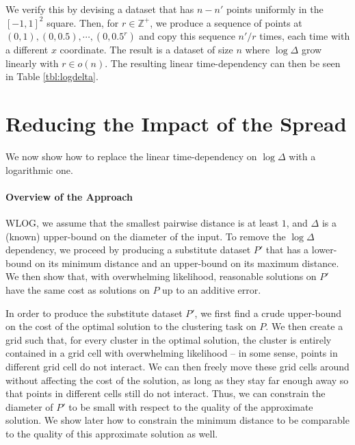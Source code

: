 We verify this by devising a dataset that has $n - n'$ points uniformly in the $[-1, 1]^2$ square. Then, for $r \in \mathbb{Z}^+$, we produce a sequence of
points at $(0, 1), (0, 0.5), \cdots, (0, 0.5^r)$ and copy this sequence $n' / r$ times, each time with a different $x$ coordinate. The result is a dataset of
size $n$ where $\log \Delta$ grow linearly with $r \in o(n)$. The resulting linear time-dependency can then be seen in Table \ref{tbl:logdelta}.



\section{Reducing the Impact of the Spread}
\label{sec:theory} %
\newcommand{\boxsize}{\textsc{MaxDist}}
We now show how to replace the linear time-dependency on $\log \Delta$ with a logarithmic one.

\paragraph*{Overview of the Approach}

WLOG, we assume that the smallest pairwise distance is at least $1$, and $\Delta$ is a (known) upper-bound on the diameter of the input. To remove
the $\log\Delta$ dependency, we proceed by producing a substitute dataset $P'$ that has a lower-bound on its minimum distance and an upper-bound on its maximum
distance. We then show that, with overwhelming likelihood, reasonable solutions on $P'$ have the same cost as solutions on $P$ up to an additive error.

In order to produce the substitute dataset $P'$, we first find a crude upper-bound on the cost of the optimal solution to the clustering task on $P$. We
then create a grid such that, for every cluster in the optimal solution, the cluster is entirely contained in a grid cell with overwhelming likelihood -- in some sense, points in different grid cell do not interact. We can then freely move these
grid cells around without affecting the cost of the solution, as long as they stay far enough away so that points in different cells still do not interact. 
Thus, we can constrain the diameter of $P'$ to be small with respect to the quality of the approximate solution. We show later how to constrain the minimum distance to be comparable to the quality of this approximate solution as well.


